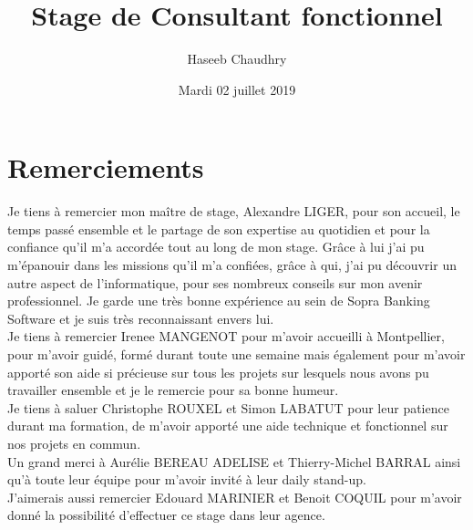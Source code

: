 \documentclass[a4paper, 12pt, twoside]{article}
\author{Haseeb Chaudhry}
\title{Stage de Consultant fonctionnel}
\date{Mardi 02 juillet 2019}
\begin{document}
\pagedegarde

\section*{Remerciements}
Je tiens à remercier mon maître de stage, Alexandre LIGER, pour son
accueil, le temps passé ensemble et le partage de son expertise au quotidien et pour la confiance qu'il m'a accordée tout au long de mon stage. Grâce à lui j'ai pu m'épanouir dans les missions qu'il m'a confiées, grâce à qui, j'ai pu découvrir un autre aspect de l'informatique, pour ses nombreux conseils sur mon avenir professionnel. Je garde une très bonne expérience au sein de Sopra Banking Software et je suis très reconnaissant envers lui.\\

Je tiens à remercier Irenee MANGENOT pour m'avoir accueilli à Montpellier, pour m'avoir guidé, formé durant toute une semaine mais également pour m'avoir apporté son aide si précieuse sur tous les projets sur lesquels nous avons pu travailler ensemble et je le remercie pour sa bonne humeur.\\

Je tiens à saluer Christophe ROUXEL et Simon LABATUT pour leur patience durant ma formation, de m'avoir apporté une aide technique et fonctionnel sur nos projets en commun.\\

Un grand merci à Aurélie BEREAU ADELISE et Thierry-Michel BARRAL ainsi qu'à toute leur équipe pour m'avoir invité à leur daily stand-up.\\

J'aimerais aussi remercier Edouard MARINIER et Benoit COQUIL pour m'avoir donné la possibilité d'effectuer ce stage dans leur agence.

\newpage

\tableofcontents















\end{document}
